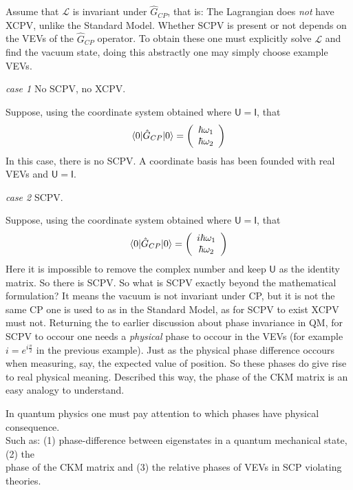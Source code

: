 Assume that $\mathcal{L}$ is invariant under $\hat{G}_{CP}$, that is: The Lagrangian does \textit{not} have XCPV, unlike the Standard Model. Whether SCPV is present or not depends on the VEVs of the $\hat{G}_{CP}$ operator. To obtain these one must explicitly solve $\mathcal{L}$ and find the vacuum state, doing this abstractly one may simply choose example VEVs.\\

\begin{flushleft}\textit{case 1} No SCPV, no XCPV. \end{flushleft} 
Suppose, using the coordinate system obtained where $\mathsf{U}=\mathsf{I}$, that
\begin{align*}
\braket{0|\hat{G}_{CP}|0} = \left( \begin{array}{c} \hbar \omega_1 \\ \hbar \omega_2 \end{array}\right)
\end{align*}
In this case, there is no SCPV. A coordinate basis has been founded with real VEVs and $\mathsf{U} = \mathsf{I}$.

\begin{flushleft}\textit{case 2} SCPV. \end{flushleft} 
Suppose, using the coordinate system obtained where $\mathsf{U}=\mathsf{I}$, that
\begin{align*}
\braket{0|\hat{G}_{CP}|0} = \left( \begin{array}{c} i\hbar \omega_1 \\ \hbar \omega_2 \end{array}\right)
\end{align*}
Here it is impossible to remove the complex number and keep $\mathsf{U}$ as the identity matrix. So there is SCPV. So what is SCPV exactly beyond the mathematical formulation? It means the vacuum is not invariant under CP, but it is not the same CP one is used to as in the Standard Model, as for SCPV to exist XCPV must not. Returning the to earlier discussion about phase invariance in QM, for SCPV to occour one  needs a \textit{physical} phase to occour in the VEVs (for example $i=e^{i\frac{\pi}{2}}$ in the previous example). Just as the physical phase difference occours when measuring, say, the expected value of position. So these phases do give rise to real physical meaning. Described this way, the phase of the CKM matrix is an easy analogy to understand.

\begin{center}
In quantum physics one must pay attention to which phases have physical consequence. \\Such as: (1) phase-difference between eigenstates in a quantum mechanical state, (2) the\\ phase of the CKM matrix and (3) the relative phases of VEVs in SCP violating theories.
\end{center}


